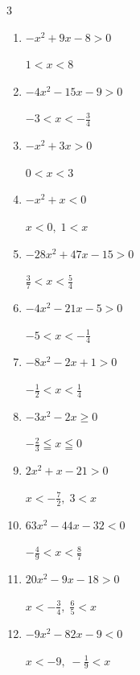 \begin{multicols}{3}
\begin{enumerate}
        $\displaystyle 0 \leqq x \leqq \frac{1}{3}$

\columnbreak %

\resetques

  \item $-x^{2}+9x-8>0$

        $\displaystyle 1 < x < 8$

  \item $-4x^{2}-15x-9>0$

        $\displaystyle -3 < x < -\frac{3}{4}$

  \item $-x^{2}+3x>0$

        $\displaystyle 0 < x < 3$

  \item $-x^{2}+x<0$

        $\displaystyle x < 0 , \; 1 < x$

  \item $-28x^{2}+47x-15>0$

        $\displaystyle \frac{3}{7} < x < \frac{5}{4}$

  \item $-4x^{2}-21x-5>0$

        $\displaystyle -5 < x < -\frac{1}{4}$

  \item $-8x^{2}-2x+1>0$

        $\displaystyle -\frac{1}{2} < x < \frac{1}{4}$

  \item $-3x^{2}-2x\geq 0$

        $\displaystyle -\frac{2}{3} \leqq x \leqq 0$

  \item $2x^{2}+x-21>0$

        $\displaystyle x < -\frac{7}{2} , \; 3 < x$

  \item $63x^{2}-44x-32<0$

        $\displaystyle -\frac{4}{9} < x < \frac{8}{7}$

\columnbreak %

  \item $20x^{2}-9x-18>0$

        $\displaystyle x < -\frac{3}{4} , \; \frac{6}{5} < x$

  \item $-9x^{2}-82x-9<0$

        $\displaystyle x < -9 , \; -\frac{1}{9} < x$


\end{enumerate}
\end{multicols}
